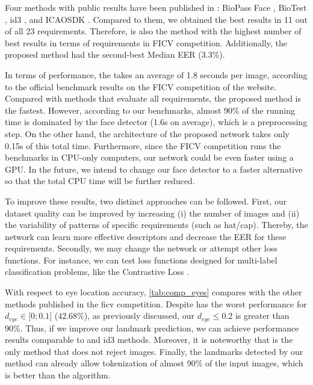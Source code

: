 
 
Four methods with public results have been published in \fvcongoing: BioPass Face \citep{fvcVsoft}, BioTest \citep{fvcBioTest}, id3 \citep{fvcICAOCompliance}, and ICAOSDK \citep{fvcSeamfix}. Compared to them, we obtained the best results in 11 out of all 23 requirements. Therefore, \methodname is also the method with the highest number of best results in terms of requirements in FICV competition. Additionally, the proposed method had the second-best Median EER (3.3\%).
 
In terms of performance, the \methodname takes an average of 1.8 seconds per image, according to the official benchmark results on the FICV competition of the \fvcongoing website. Compared with methods that evaluate all requirements, the proposed method is the fastest. However, according to our benchmarks, almost 90\% of the \methodname running time is dominated by the face detector (1.6s on average), which is a preprocessing step. On the other hand, the architecture of the proposed network takes only 0.15s of this total time. Furthermore, since the FICV competition runs the benchmarks in CPU-only computers, our network could be even faster using a GPU. In the future, we intend to change our face detector to a faster alternative so that the total CPU time will be further reduced.
 
To improve these results, two distinct approaches can be followed. First, our dataset quality can be improved by increasing (i) the number of images and (ii) the variability of patterns of specific requirements (such as hat/cap). Thereby, the network can learn more effective descriptors and decrease the EER for these requirements. Secondly, we may change the network or attempt other loss functions. For instance, we can test loss functions designed for multi-label classification problems, like the Contrastive Loss \citep{khosla2020supervised}.
 
With respect to eye location accuracy, \autoref{tab:comp_eyes} compares \methodname with the other methods published in the \acs{ficv} competition. Despite \methodname has the worst performance for $d_{eye} \in [0;0.1[$ ($42.68\%$), as previously discussed, our $d_{eye} \leq 0.2$ is greater than 90\%. Thus, if we improve our landmark prediction, we can achieve performance results comparable to \biopass and id3 methods. Moreover, it is noteworthy that \methodname is the only method that does not reject images. Finally, the landmarks detected by our method can already allow tokenization of almost 90\% of the input images, which is better than the \biotest algorithm.
 

